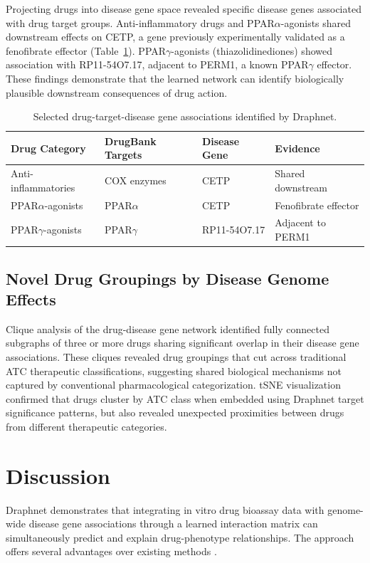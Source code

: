 \documentclass[12pt]{article}
\begin{document}
Projecting drugs into disease gene space revealed specific disease genes associated with drug target groups. Anti-inflammatory drugs and PPAR$\alpha$-agonists shared downstream effects on CETP, a gene previously experimentally validated as a fenofibrate effector (Table~\ref{tab:genes}). PPAR$\gamma$-agonists (thiazolidinediones) showed association with RP11-54O7.17, adjacent to PERM1, a known PPAR$\gamma$ effector. These findings demonstrate that the learned network can identify biologically plausible downstream consequences of drug action.

\begin{table}[htbp]
\centering
\caption{Selected drug-target-disease gene associations identified by Draphnet.}
\label{tab:genes}
\begin{tabular}{llll}
\toprule
Drug Category & DrugBank Targets & Disease Gene & Evidence \\
\midrule
Anti-inflammatories & COX enzymes & CETP & Shared downstream \\
PPAR$\alpha$-agonists & PPAR$\alpha$ & CETP & Fenofibrate effector \\
PPAR$\gamma$-agonists & PPAR$\gamma$ & RP11-54O7.17 & Adjacent to PERM1 \\
\bottomrule
\end{tabular}
\end{table}

\subsection{Novel Drug Groupings by Disease Genome Effects}

Clique analysis of the drug-disease gene network identified fully connected subgraphs of three or more drugs sharing significant overlap in their disease gene associations. These cliques revealed drug groupings that cut across traditional ATC therapeutic classifications, suggesting shared biological mechanisms not captured by conventional pharmacological categorization. tSNE visualization confirmed that drugs cluster by ATC class when embedded using Draphnet target significance patterns, but also revealed unexpected proximities between drugs from different therapeutic categories.

\section{Discussion}

Draphnet demonstrates that integrating in vitro drug bioassay data with genome-wide disease gene associations through a learned interaction matrix can simultaneously predict and explain drug-phenotype relationships. The approach offers several advantages over existing methods \citep{nabirotchkin2020drug, pushpakom2019drug}.
\end{document}
